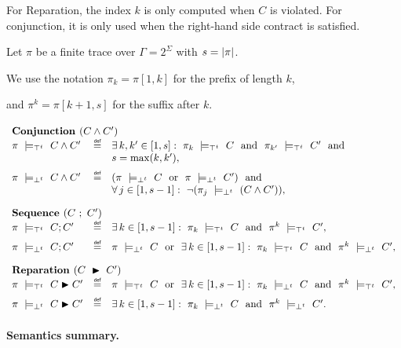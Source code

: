 For Reparation, the index $k$ is only computed when $C$ is violated. For conjunction, it is only used when the right-hand side contract is satisfied.

\begin{definition}

  \label{def:binary-contract-semantics}

  Let $\pi$ be a finite trace over $\Gamma = 2^{\Sigma}$ with  $s=\vert \pi\vert$.

  We use the notation $\pi_k = \pi[1,k]$ for the prefix of length $k$,

  and $\pi^k = \pi[k+1,s]$ for the suffix after $k$.

  \[
  \begin{array}{l@{\quad}c@{\quad}l}
  \multicolumn{3}{l}{\textbf{Conjunction }(C \wedge C')}\rule{0pt}{2.4ex}\\
  \pi\ \satt\ C \wedge C'
  &\mydef&
  \exists\,k,k' \in [1,s]:\
  \pi_{k}\ \satt\ C\ \nd\
  \pi_{k'}\ \satt\ C'\ \nd\ \\
  & &s=\max(k,k'),
  \\[1.2ex]
  \pi\ \violt\ C \wedge C'
  &\mydef&
  (\pi\ \violt\ C\ \sor\ \pi\ \violt\ C')\ \nd\ \\
  & &\forall\,j \in [1, s-1]:\ \lnot(\pi_{j}\ \violt\ (C \wedge C')),
  \\[2ex]
  \multicolumn{3}{l}{\textbf{Sequence }(C\ ;\ C')}\rule{0pt}{2.4ex}\\
  \pi\ \satt\ C ; C'
  &\mydef&
  \exists\,k \in [1, s-1]:\ \pi_k\ \satt\ C\ \nd\ \pi^{k}\ \satt\ C',
  \\[1.2ex]
  \pi\ \violt\ C ; C'
  &\mydef&
  \pi\ \violt\ C\ \sor\
  \exists\,k \in [1, s-1]:\ \pi_k\ \satt\ C\ \nd\ \pi^{k}\ \violt\ C',
  \\[2ex]
  \multicolumn{3}{l}{\textbf{Reparation }(C\ \repair\ C')}\rule{0pt}{2.4ex}\\
  \pi\ \satt\ C \repair C'
  &\mydef&
  \pi\ \satt\ C\ \sor\
  \exists\,k \in [1, s-1]:\ \pi_k\ \violt\ C\ \nd\ \pi^{k}\ \satt\ C',
  \\[1.2ex]
  \pi\ \violt\ C \repair C'
  &\mydef&
  \exists\,k \in [1, s-1]:\ \pi_k\ \violt\ C\ \nd\ \pi^{k}\ \violt\ C'.
  \end{array}
  \]

\end{definition}



\paragraph{Semantics summary.}



